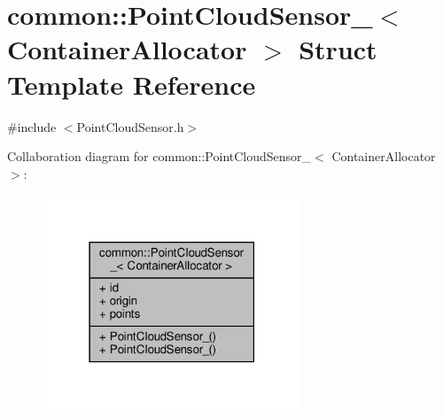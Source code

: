 \hypertarget{structcommon_1_1PointCloudSensor__}{}\section{common\+:\+:Point\+Cloud\+Sensor\+\_\+$<$ Container\+Allocator $>$ Struct Template Reference}
\label{structcommon_1_1PointCloudSensor__}


{\ttfamily \#include $<$Point\+Cloud\+Sensor.\+h$>$}



Collaboration diagram for common\+:\+:Point\+Cloud\+Sensor\+\_\+$<$ Container\+Allocator $>$\+:\nopagebreak
\begin{figure}[H]
\begin{center}
\leavevmode
\includegraphics[width=219pt]{d3/d46/structcommon_1_1PointCloudSensor____coll__graph}
\end{center}
\end{figure}
